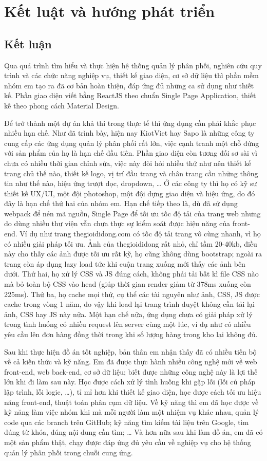 \chapter{Kết luật và hướng phát triển}
\section{Kết luận}
Qua quá trình tìm hiểu và thực hiện hệ thống quản lý phân phối,
nghiên cứu quy trình và các chức năng nghiệp vụ, thiết kế giao
diện, cơ sở dữ liệu thì phần mềm nhóm em tạo ra đã cơ bản hoàn
thiện, đáp ứng đủ những ca sử dụng như thiết kế. Phần giao diện
viết bằng ReactJS theo chuẩn Single Page Application, thiết kế theo
phong cách Material Design. 

Để trở thành một dự án khả thi trong thực tế thì ứng dụng cần phải
khắc phục nhiều hạn chế. Như đã trình bày, hiện nay KiotViet hay Sapo
là những công ty cung cấp các ứng dụng quản lý phân phối rất lớn,
việc cạnh tranh một chỗ đứng với sản phẩm của họ là hạn chế đầu tiên.
Phần giao diện còn tương đối sơ sài vì chưa có nhiều thời gian chỉnh sửa,
việc này đòi hỏi nhiều thứ như nên thiết kế trang chủ thế nào,
thiết kế logo, vị trí đầu trang và chân trang cần những thông tin
như thế nào, hiệu ứng trượt dọc, dropdown, … Ở các công ty thì họ có
kỹ sư thiết kế UX/UI, một đội photoshop, một đội dựng giao diện
và hiệu ứng, do đó đây là hạn chế thứ hai của nhóm em. Hạn chế
tiếp theo là, dù đã sử dụng webpack để nén mã nguồn, Single Page
để tối ưu tốc độ tải của trang web nhưng do dùng nhiều thư viện
vẫn chưa thực sự kiểm soát được hiệu năng của front-end. Ví dụ
như trang thegioididong.com có tốc độ tải trang vô cùng nhanh,
vì họ có nhiều giải pháp tối ưu. Ảnh của thegioididong rất nhỏ,
chỉ tầm 20-40kb, điều này cho thấy các ảnh được tối ưu rất kỹ,
họ cũng không dùng bootstrap; ngoài ra trang còn áp dụng lazy load tức
khi cuộn trang xuống mới thấy các ảnh bên dưới. Thứ hai, họ xử lý
CSS và JS đúng cách, không phải tải bất kì file CSS nào mà bỏ toàn
bộ CSS vào head (giúp thời gian render giảm từ 378ms xuống còn 225ms).
Thứ ba, họ cache mọi thứ, cụ thể các tài nguyên như ảnh, CSS, JS
được cache trong vòng 1 năm, do vậy khi load lại trang trình
duyệt không cần tải lại ảnh, CSS hay JS này nữa. Một hạn
chế nữa, ứng dụng chưa có giải pháp xử lý trong tình huống có nhiều
request lên server cùng một lúc, ví dụ như có nhiều yêu cầu lên
đơn hàng đồng thời trong khi số lượng hàng trong kho lại không đủ.

Sau khi thực hiện đồ án tốt nghiệp, bản thân em nhận thấy đã có
nhiều tiến bộ về cả kiến thức và kỹ năng. Em đã được thực hành nhiều
công nghệ mới về web front-end, web back-end, cơ sở dữ liệu;
biết được những công nghệ này là lợi thế lớn khi đi làm sau này.
Học được cách xử lý tình huống khi gặp lỗi (lỗi cú pháp lập trình,
lỗi logic, …), tỉ mỉ hơn khi thiết kế giao diện, học được cách tối ưu
hiệu năng front-end, thuật toán phân cụm dữ liệu. Về kỹ năng thì
em đã học được về kỹ năng làm việc nhóm khi mà mỗi người làm một
nhiệm vụ khác nhau, quản lý code qua các branch trên GitHub;
kỹ năng tìm kiếm tài liệu trên Google, tìm đúng từ khóa,
đúng nội dung cần tìm; … Và hơn nữa sau khi làm đồ án, em đã có
một sản phẩm thật, chạy được đáp ứng đủ yêu cầu về nghiệp vụ
cho hệ thống quản lý phân phối trong chuỗi cung ứng.


